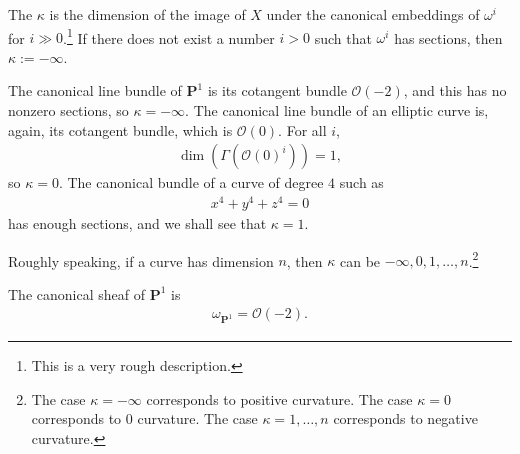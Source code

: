 \documentclass [11 pt, oneside] {article}
\begin{document}
\begin{example}\label{}\text{}
The  $\kappa$ is the dimension of the image of $X$ under the canonical embeddings of $\omega^i$ for $i\gg 0$.\footnote{This is a very rough description.} If there does not exist a number $i>0$ such that $\omega^i$ has sections, then $\kappa := -\infty$.

The canonical line bundle of $\mathbf{P}^1$ is its cotangent bundle $\mathscr{O}(-2)$, and this has no nonzero sections, so $\kappa = -\infty$.
The canonical line bundle of an elliptic curve is, again, its cotangent bundle, which is $\mathscr{O}(0)$. For all $i$,
\begin{align*}
	\dim(\Gamma(\mathscr{O}(0)^i)) = 1,
\end{align*}
so $\kappa = 0$.
The canonical bundle of a curve of degree $4$ such as 
\begin{align*}
	x^4 + y^4 + z^4 =0
\end{align*}
has enough sections, and we shall see that $\kappa = 1$.

Roughly speaking, if a curve has dimension $n$, then $\kappa$ can be $-\infty,0,1,\hdots, n$.\footnote{The case $\kappa = -\infty$ corresponds to positive curvature. The case $\kappa = 0$ corresponds to $0$ curvature. The case $\kappa = 1,\hdots, n$ corresponds to negative curvature.}
\end{example}

The canonical sheaf of $\mathbf{P}^1$ is
\begin{align*}
	\omega_{\mathbf{P}^1} = \mathscr{O}(-2).
\end{align*}
\end{document}
